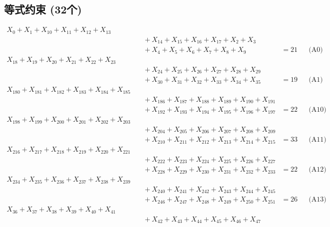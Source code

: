 \documentclass[a4paper,10pt]{article}
\begin{document}
\subsection{等式约束 (32个)}

\allowdisplaybreaks
{\small\begin{align}
X_{0} + X_{1} + X_{10} + X_{11} + X_{12} + X_{13} \\[0.5ex]
&\quad  + X_{14} + X_{15} + X_{16} + X_{17} + X_{2} + X_{3} \\[0.5ex]
&\quad  + X_{4} + X_{5} + X_{6} + X_{7} + X_{8} + X_{9} &= 21 && \text{(A0)} \\
X_{18} + X_{19} + X_{20} + X_{21} + X_{22} + X_{23} \\[0.5ex]
&\quad  + X_{24} + X_{25} + X_{26} + X_{27} + X_{28} + X_{29} \\[0.5ex]
&\quad  + X_{30} + X_{31} + X_{32} + X_{33} + X_{34} + X_{35} &= 19 && \text{(A1)} \\
X_{180} + X_{181} + X_{182} + X_{183} + X_{184} + X_{185} \\[0.5ex]
&\quad  + X_{186} + X_{187} + X_{188} + X_{189} + X_{190} + X_{191} \\[0.5ex]
&\quad  + X_{192} + X_{193} + X_{194} + X_{195} + X_{196} + X_{197} &= 22 && \text{(A10)} \\
X_{198} + X_{199} + X_{200} + X_{201} + X_{202} + X_{203} \\[0.5ex]
&\quad  + X_{204} + X_{205} + X_{206} + X_{207} + X_{208} + X_{209} \\[0.5ex]
&\quad  + X_{210} + X_{211} + X_{212} + X_{213} + X_{214} + X_{215} &= 33 && \text{(A11)} \\
X_{216} + X_{217} + X_{218} + X_{219} + X_{220} + X_{221} \\[0.5ex]
&\quad  + X_{222} + X_{223} + X_{224} + X_{225} + X_{226} + X_{227} \\[0.5ex]
&\quad  + X_{228} + X_{229} + X_{230} + X_{231} + X_{232} + X_{233} &= 22 && \text{(A12)} \\
X_{234} + X_{235} + X_{236} + X_{237} + X_{238} + X_{239} \\[0.5ex]
&\quad  + X_{240} + X_{241} + X_{242} + X_{243} + X_{244} + X_{245} \\[0.5ex]
&\quad  + X_{246} + X_{247} + X_{248} + X_{249} + X_{250} + X_{251} &= 26 && \text{(A13)} \\
X_{36} + X_{37} + X_{38} + X_{39} + X_{40} + X_{41} \\[0.5ex]
&\quad  + X_{42} + X_{43} + X_{44} + X_{45} + X_{46} + X_{47} \\[0.5ex]

\end{align}}
\end{document}
